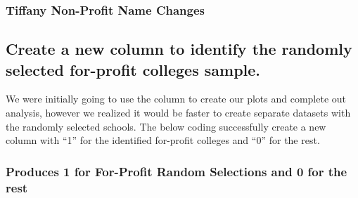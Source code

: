 \documentclass[
]{article}
\newenvironment{Shaded}{\begin{snugshade}}{\end{snugshade}}
\newcommand{\KeywordTok}[1]{\textcolor[rgb]{0.13,0.29,0.53}{\textbf{#1}}}
\newcommand{\NormalTok}[1]{#1}
\newcommand{\OperatorTok}[1]{\textcolor[rgb]{0.81,0.36,0.00}{\textbf{#1}}}
\newcommand{\StringTok}[1]{\textcolor[rgb]{0.31,0.60,0.02}{#1}}
\begin{document}
\hypertarget{tiffany-non-profit-name-changes}{%
\subsubsection{Tiffany Non-Profit Name
Changes}\label{tiffany-non-profit-name-changes}}

\begin{Shaded}
\end{Shaded}

\hypertarget{create-a-new-column-to-identify-the-randomly-selected-for-profit-colleges-sample.}{%
\subsection{Create a new column to identify the randomly selected
for-profit colleges
sample.}\label{create-a-new-column-to-identify-the-randomly-selected-for-profit-colleges-sample.}}

We were initially going to use the column to create our plots and
complete out analysis, however we realized it would be faster to create
separate datasets with the randomly selected schools. The below coding
successfully create a new column with ``1'' for the identified
for-profit colleges and ``0'' for the rest.

\hypertarget{produces-1-for-for-profit-random-selections-and-0-for-the-rest}{%
\subsubsection{Produces 1 for For-Profit Random Selections and 0 for the
rest}\label{produces-1-for-for-profit-random-selections-and-0-for-the-rest}}
\end{document}
